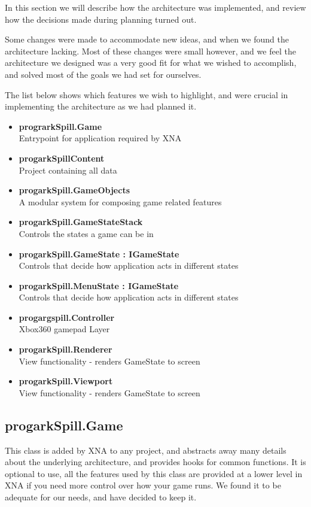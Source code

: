 
In this section we will describe how the architecture was implemented, and
review how the decisions made during planning turned out.

Some changes were made to accommodate new ideas, and when we found the
architecture lacking. Most of these changes were small however, and we feel
the architecture we designed was a very good fit for what we wished to
accomplish, and solved most of the goals we had set for ourselves.

The list below shows which features we wish to highlight, and were crucial
in implementing the architecture as we had planned it.

\begin{itemize}
	\item \textbf{prograrkSpill.Game} \\
	      Entrypoint for application required by XNA
	\item \textbf{progarkSpillContent} \\
	      Project containing all data
  	\item \textbf{progarkSpill.GameObjects} \\
  	      A modular system for composing game related features
  	\item \textbf{progarkSpill.GameStateStack} \\
  	      Controls the states a game can be in		
	\item \textbf{progarkSpill.GameState : IGameState} \\
	      Controls that decide how application acts in different states 
	\item \textbf{progarkSpill.MenuState : IGameState} \\
	      Controls that decide how application acts in different states 
	\item \textbf{progargspill.Controller} \\
	      Xbox360 gamepad Layer
	\item \textbf{progarkSpill.Renderer} \\
	      View functionality - renders GameState to screen 
	\item \textbf{progarkSpill.Viewport} \\
	      View functionality - renders GameState to screen
\end{itemize}

\subsection{progarkSpill.Game}
This class is added by XNA to any project, and abstracts away many details
about the underlying architecture, and provides hooks for common functions.
It is optional to use, all the features used by this class are provided at
a lower level in XNA if you need more control over how your game runs. We
found it to be adequate for our needs, and have decided to keep it.

